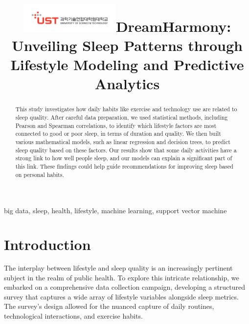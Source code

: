 \documentclass[conference]{IEEEtran}
\begin{document}

\title{\includegraphics[width=5cm]{images/ust.png}\linebreak DreamHarmony: Unveiling Sleep Patterns through Lifestyle Modeling and Predictive Analytics
}

\author{
}

\maketitle
\thispagestyle{plain} %
\pagestyle{plain} %

\begin{abstract}
    This study investigates how daily habits like exercise and technology use are related to sleep quality. After careful data preparation, we used statistical methods, including Pearson\cite{pearson} and Spearman correlations\cite{spearman}, to identify which lifestyle factors are most connected to good or poor sleep, in terms of duration and quality. We then built various mathematical models, such as linear regression and decision trees, to predict sleep quality based on these factors. Our results show that some daily activities have a strong link to how well people sleep, and our models can explain a significant part of this link. These findings could help guide recommendations for improving sleep based on personal habits.
\end{abstract}

\begin{IEEEkeywords}
    big data, sleep, health, lifestyle, machine learning, support vector machine
\end{IEEEkeywords}

\section{Introduction}
The interplay between lifestyle and sleep quality is an increasingly pertinent subject in the realm of public health. To explore this intricate relationship, we embarked on a comprehensive data collection campaign, developing a structured survey that captures a wide array of lifestyle variables alongside sleep metrics. The survey's design allowed for the nuanced capture of daily routines, technological interactions, and exercise habits.
\end{document}
